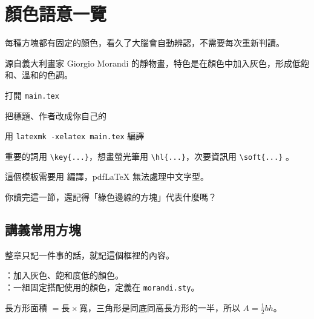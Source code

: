 \documentclass{morandi-adhd}
\begin{document}
\takeabreak

\section{顏色語意一覽}

每種方塊都有固定的顏色，看久了大腦會自動辨認，不需要每次重新判讀。

\begin{definition}[莫蘭迪色]
  源自義大利畫家 Giorgio Morandi 的靜物畫，特色是在顏色中加入灰色，形成低飽和、溫和的色調。
\end{definition}

\begin{example}
  \begin{steps}
    \item 打開 \texttt{main.tex}
    \item 把標題、作者改成你自己的
    \item 用 \texttt{latexmk -xelatex main.tex} 編譯
  \end{steps}
\end{example}

\begin{tip}
  重要的詞用 \verb|\key{...}|，想畫螢光筆用 \verb|\hl{...}|，次要資訊用 \verb|\soft{...}| 。
\end{tip}

\begin{warning}
  這個模板需要用  編譯，pdfLaTeX 無法處理中文字型。
\end{warning}

\begin{question}
  你讀完這一節，還記得「綠色邊線的方塊」代表什麼嗎？
\end{question}

\subsection{講義常用方塊}

\begin{bigidea}
  整章只記一件事的話，就記這個框裡的內容。
\end{bigidea}

\begin{terms}
  ：加入灰色、飽和度低的顏色。\\
  ：一組固定搭配使用的顏色，定義在 \texttt{morandi.sty}。
\end{terms}

\begin{derivation}[面積公式]
  長方形面積 $= \text{長} \times \text{寬}$，三角形是同底同高長方形的一半，所以
  $A = \tfrac{1}{2}bh$。
\end{derivation}
\end{document}

